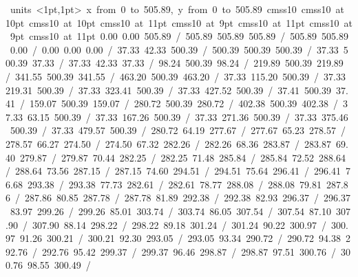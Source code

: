 \hbox{\beginpicture
\setcoordinatesystem units <1pt,1pt>
\setplotarea x from 0 to 505.89, y from 0 to 505.89
\setlinear
\font\picfont cmss10\picfont
\font\picfont cmss10 at 10pt\picfont
\font\picfont cmss10 at 10pt\picfont
\font\picfont cmss10 at 11pt\picfont
\font\picfont cmss10 at 9pt\picfont
\font\picfont cmss10 at 11pt\picfont
\font\picfont cmss10 at 9pt\picfont
\font\picfont cmss10 at 11pt\picfont
\setsolid
{} 0.00 0.00 505.89 /
 505.89 505.89 505.89 /
 505.89 505.89 0.00 /
 0.00 0.00 0.00 /
\setsolid
{} 37.33 42.33 500.39 /
 500.39 500.39 500.39 /
 37.33 500.39 37.33 /
 37.33 42.33 37.33 /
\setsolid
{} 98.24 500.39 98.24 /
\setsolid
{} 219.89 500.39 219.89 /
\setsolid
{} 341.55 500.39 341.55 /
\setsolid
{} 463.20 500.39 463.20 /
\setsolid
{} 37.33 115.20 500.39 /
\setsolid
{} 37.33 219.31 500.39 /
\setsolid
{} 37.33 323.41 500.39 /
\setsolid
{} 37.33 427.52 500.39 /
\setsolid
{} 37.41 500.39 37.41 /
\setsolid
{} 159.07 500.39 159.07 /
\setsolid
{} 280.72 500.39 280.72 /
\setsolid
{} 402.38 500.39 402.38 /
\setsolid
{} 37.33 63.15 500.39 /
\setsolid
{} 37.33 167.26 500.39 /
\setsolid
{} 37.33 271.36 500.39 /
\setsolid
{} 37.33 375.46 500.39 /
\setsolid
{} 37.33 479.57 500.39 /
\setsolid
{} 280.72 64.19 277.67 /
 277.67 65.23 278.57 /
 278.57 66.27 274.50 /
 274.50 67.32 282.26 /
 282.26 68.36 283.87 /
 283.87 69.40 279.87 /
 279.87 70.44 282.25 /
 282.25 71.48 285.84 /
 285.84 72.52 288.64 /
 288.64 73.56 287.15 /
 287.15 74.60 294.51 /
 294.51 75.64 296.41 /
 296.41 76.68 293.38 /
 293.38 77.73 282.61 /
 282.61 78.77 288.08 /
 288.08 79.81 287.86 /
 287.86 80.85 287.78 /
 287.78 81.89 292.38 /
 292.38 82.93 296.37 /
 296.37 83.97 299.26 /
 299.26 85.01 303.74 /
 303.74 86.05 307.54 /
 307.54 87.10 307.90 /
 307.90 88.14 298.22 /
 298.22 89.18 301.24 /
 301.24 90.22 300.97 /
 300.97 91.26 300.21 /
 300.21 92.30 293.05 /
 293.05 93.34 290.72 /
 290.72 94.38 292.76 /
 292.76 95.42 299.37 /
 299.37 96.46 298.87 /
 298.87 97.51 300.76 /
 300.76 98.55 300.49 /
}
